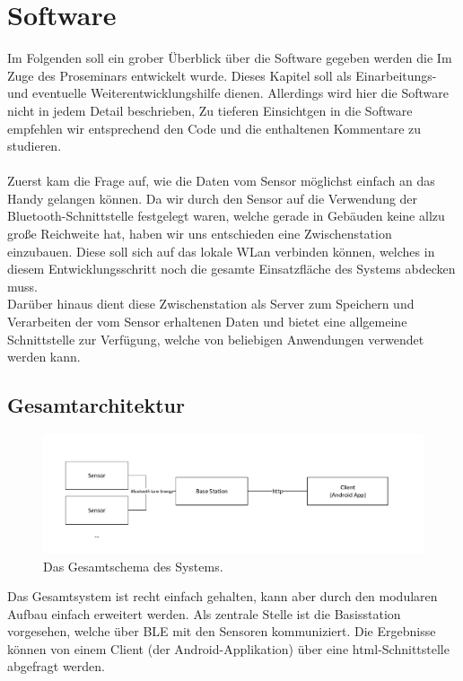 \section{Software}
Im Folgenden soll ein grober Überblick über die Software gegeben werden die Im Zuge des Proseminars entwickelt wurde. Dieses Kapitel soll als Einarbeitungs- und eventuelle Weiterentwicklungshilfe dienen. Allerdings wird hier die Software nicht in jedem Detail beschrieben, Zu tieferen Einsichtgen in die Software empfehlen wir entsprechend den Code und die enthaltenen Kommentare zu studieren.
\\
\\
Zuerst kam die Frage auf, wie die Daten vom Sensor möglichst einfach an das Handy gelangen können. Da wir durch den Sensor auf die Verwendung der Bluetooth-Schnittstelle festgelegt waren, welche gerade in Gebäuden keine allzu große Reichweite hat, haben wir uns entschieden eine Zwischenstation einzubauen. Diese soll sich auf das lokale WLan verbinden können, welches in diesem Entwicklungsschritt noch die gesamte Einsatzfläche des Systems abdecken muss. \\
Darüber hinaus dient diese Zwischenstation als Server zum Speichern und Verarbeiten der vom Sensor erhaltenen Daten und bietet eine allgemeine Schnittstelle zur Verfügung, welche von beliebigen Anwendungen verwendet werden kann.
\subsection{Gesamtarchitektur}
\begin{figure}[htb] 
	\centerline{\includegraphics[scale=.5]{Architektur/dryR_complete.pdf}}
	\caption{Das Gesamtschema des Systems.}
\end{figure}

Das Gesamtsystem ist recht einfach gehalten, kann aber durch den modularen Aufbau einfach erweitert werden. Als zentrale Stelle ist die Basisstation vorgesehen, welche über BLE mit den Sensoren kommuniziert. Die Ergebnisse können von einem Client (der Android-Applikation) über eine html-Schnittstelle abgefragt werden.
